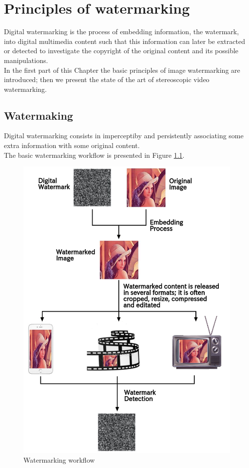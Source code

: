 \chapter{Principles of watermarking}
\label{wat}

Digital watermarking is the process of embedding information, the watermark, into digital multimedia content such that this information can later be extracted or detected to investigate the copyright of the original content
and its possible manipulations.\\
In the first part of this Chapter the basic principles of image watermarking are introduced; then we present the state of the art of stereoscopic video watermarking.


\section{Watermaking}

Digital watermarking consists in imperceptiby and persistently associating some extra information with some original content. \\
The basic watermarking workflow is presented in Figure \ref{fig:workflow}.\\
\begin{figure}[h!]
\centering
\includegraphics[width=1\textwidth]{./img/wat_workflow.png}
\caption{\small{Watermarking workflow}}
\label{fig:workflow}
\end{figure}
\clearpage
